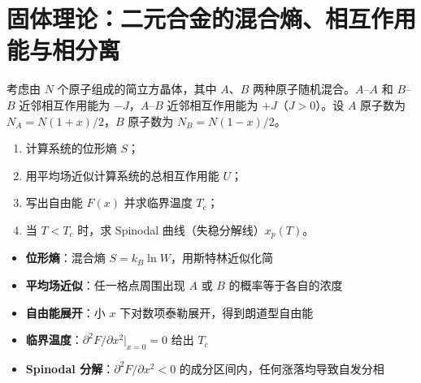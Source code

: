 \section{固体理论：二元合金的混合熵、相互作用能与相分离}
\label{sec:alloy-mixing-entropy}

\begin{modelbox}[题目：简立方二元合金的统计热力学与相分离]
考虑由 $N$ 个原子组成的简立方晶体，其中 $A$、$B$ 两种原子随机混合。$A$--$A$ 和 $B$--$B$ 近邻相互作用能为 $-J$，$A$--$B$ 近邻相互作用能为 $+J$（$J>0$）。设 $A$ 原子数为 $N_A=N(1+x)/2$，$B$ 原子数为 $N_B=N(1-x)/2$。
\begin{enumerate}
    \item 计算系统的位形熵 $S$；
    \item 用平均场近似计算系统的总相互作用能 $U$；
    \item 写出自由能 $F(x)$ 并求临界温度 $T_c$；
    \item 当 $T<T_c$ 时，求 Spinodal 曲线（失稳分解线）$x_p(T)$。
\end{enumerate}
\end{modelbox}

\begin{tipbox}[考点快速分析]
\begin{itemize}
    \item \textbf{位形熵}：混合熵 $S=k_B\ln W$，用斯特林近似化简
    \item \textbf{平均场近似}：任一格点周围出现 $A$ 或 $B$ 的概率等于各自的浓度
    \item \textbf{自由能展开}：小 $x$ 下对数项泰勒展开，得到朗道型自由能
    \item \textbf{临界温度}：$\partial^2 F/\partial x^2|_{x=0}=0$ 给出 $T_c$
    \item \textbf{Spinodal 分解}：$\partial^2 F/\partial x^2<0$ 的成分区间内，任何涨落均导致自发分相
\end{itemize}
\end{tipbox}

